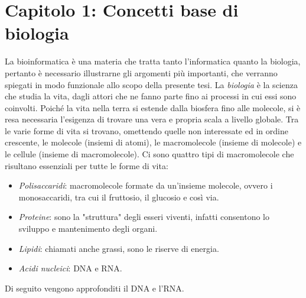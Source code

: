 \chapter{Capitolo 1: Concetti base di biologia}
La bioinformatica è una materia che tratta tanto l'informatica quanto la biologia, pertanto è necessario illustrarne gli argomenti più importanti, che verranno spiegati in modo funzionale allo scopo della presente tesi.
\newline
La \textit{biologia} è la scienza che studia la vita, dagli attori che ne fanno parte fino ai processi in cui essi sono coinvolti. Poiché la vita nella terra si estende dalla biosfera fino alle molecole, si è resa necessaria l'esigenza di trovare una vera e propria scala a livello globale. Tra le varie forme di vita si trovano, omettendo quelle non interessate ed in ordine crescente, le molecole (insiemi di atomi), le macromolecole (insieme di molecole) e le cellule (insieme di macromolecole).
\newline
Ci sono quattro tipi di macromolecole che risultano essenziali per tutte le forme di vita:
\begin{itemize}
	\item \textit{Polisaccaridi}: macromolecole formate da un'insieme molecole, ovvero i monosaccaridi, tra cui il fruttosio, il glucosio e così via.
	\item \textit{Proteine}: sono la "struttura" degli esseri viventi, infatti consentono lo sviluppo e mantenimento degli organi.
	\item \textit{Lipidi}: chiamati anche grassi, sono le riserve di energia.
	\item \textit{Acidi nucleici}: DNA e RNA.
\end{itemize}
Di seguito vengono approfonditi il DNA e l'RNA.
\newpage

